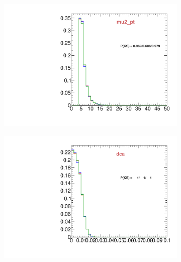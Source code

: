 \begin{figure}
\begin{subfigure}[b]{0.2\textwidth}
                \includegraphics[width=\textwidth]{Figures/VariablesComparison/Data_barrel_figs_3h/mu2_pt}
                \label{fig:Data_barrel_mu2_pt_3h}
        \end{subfigure}
        \begin{subfigure}[b]{0.2\textwidth}
                \centering
                \includegraphics[width=\textwidth]{Figures/VariablesComparison/Data_barrel_figs_3h/dca}
                \label{fig:Data_barrel_dca_3h}
        \end{subfigure}
        \begin{subfigure}[b]{0.2\textwidth}
                \centering

\end{subfigure}
\end{figure}

